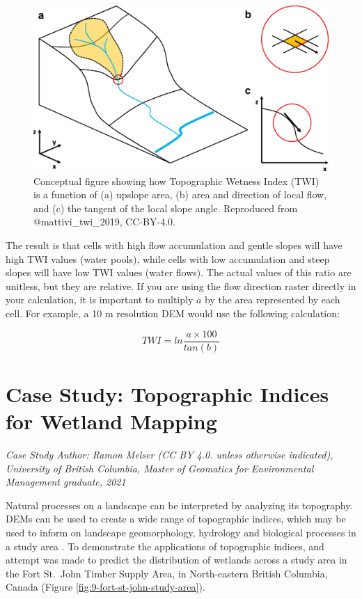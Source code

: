 \documentclass[
]{book}
\begin{document}
\begin{figure}
\includegraphics[width=0.75\linewidth]{images/09-Mattivi-et-al-2019-figure-1} \caption{Conceptual figure showing how Topographic Wetness Index (TWI) is a function of (a) upslope area, (b) area and direction of local flow, and (c) the tangent of the local slope angle. Reproduced from @mattivi_twi_2019, CC-BY-4.0.}\label{fig:9-Mattivi-et-al-2019-figure-1}
\end{figure}

The result is that cells with high flow accumulation and gentle slopes will have high TWI values (water pools), while cells with low accumulation and steep slopes will have low TWI values (water flows). The actual values of this ratio are unitless, but they are relative. If you are using the flow direction raster directly in your calculation, it is important to multiply \(a\) by the area represented by each cell. For example, a 10 m resolution DEM would use the following calculation:

\[
TWI=ln\frac{a×100}{tan(b)}
\]

\hypertarget{case-study-topographic-indices-for-wetland-mapping}{%
\section{Case Study: Topographic Indices for Wetland Mapping}\label{case-study-topographic-indices-for-wetland-mapping}}

\emph{Case Study Author: Ramon Melser (CC BY 4.0. unless otherwise indicated), University of British Columbia, Master of Geomatics for Environmental Management graduate, 2021}

Natural processes on a landscape can be interpreted by analyzing its topography. DEMs can be used to create a wide range of topographic indices, which may be used to inform on landscape geomorphology, hydrology and biological processes in a study area \citep{mattivi_twi_2019}. To demonstrate the applications of topographic indices, and attempt was made to predict the distribution of wetlands across a study area in the Fort St.~John Timber Supply Area, in North-eastern British Columbia, Canada (Figure \ref{fig:9-fort-st-john-study-area}).
\end{document}
